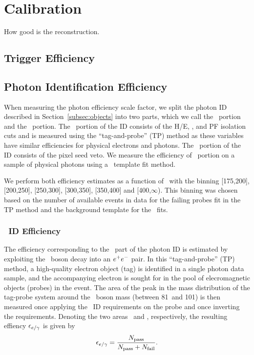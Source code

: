 \chapter{Calibration}

How good is the reconstruction.

\section{Trigger Efficiency}

\section{Photon Identification Efficiency}
\label{sec:photoneff}

When measuring the photon efficiency scale factor, we split the photon ID described in
Section~\ref{subsec:objects} into two parts, which we call the \egamma\ portion and the \Pgg\
portion. 
The \egamma\ portion of the ID consists of the H/E, \sieie, and PF isolation cuts and is measured using the ``tag-and-probe'' (TP) method as these variables have similar efficiencies for physical electrons and photons. 
The \Pgg\ portion of the ID consists of the pixel seed veto.
We measure the efficiency of \Pgg\ portion on a sample of physical photons using a \sieie\
template fit method.

We perform both efficiency estimates as a function of \pt\ with the binning [175,200], [200,250], [250,300], [300,350], [350,400] and [400,$\infty$). 
This binning was chosen based on the number of available events in data for the failing probes fit in the TP method and the background template for the \sieie\ fits.

\subsection{\egamma\ ID Efficiency}
\label{subsec:idsf}

The efficiency corresponding to the \egamma\ part of the photon ID is estimated by exploiting the \PZ\ boson decay into an ${e}^{+}{e}^{-}$ pair. 
In this ``tag-and-probe'' (TP) method, a high-quality electron object (tag) is identified in a single photon data sample, and the accompanying electron is sought for in the pool of elecromagnetic objects (probes) in the event. 
The area of the peak in the mass distribution of the tag-probe system around the \PZ\ boson mass (between 81\GeV\ and 101\GeV) is then measured once applying the \Pe\Pgg\ ID requirements on the probe and once inverting the requirements. 
Denoting the two areas \npass\ and \nfail, respectively, the resulting effiency $\epsilon_{{e}/\gamma}$ is given by
\begin{equation}
\epsilon_{{e}/\gamma} = \frac{N_{\text{pass}}}{N_{\text{pass}} + N_{\text{fail}}}.
\end{equation}

